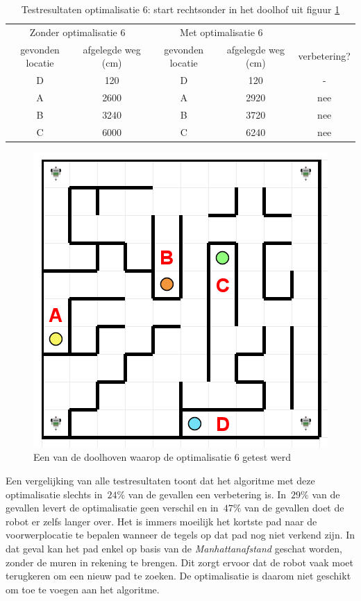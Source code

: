 \documentclass[eind]{penoverslag}
\begin{document}
\begin{table}[h]
\begin{center}
    \begin{tabular}{c | c | c | c | c}
   \multicolumn{2}{c|}{Zonder optimalisatie 6} & \multicolumn{2}{|c|}{Met optimalisatie 6} &\\
     gevonden locatie &  afgelegde weg (cm) & gevonden locatie &  afgelegde weg (cm)& verbetering?\\ \hline\hline
    D & 120 & D & 120 & -\\ \hline
    A & 2600 & A & 2920 & nee\\ \hline
    B & 3240 & B & 3720 & nee\\ \hline
    C & 6000 & C & 6240 & nee\\
    \end{tabular}
    \caption{Testresultaten optimalisatie 6: start rechtsonder in het doolhof uit figuur \ref{fig:TestDead}}
    \label{tab:resultVerken2}
\end{center}
\end{table}

\begin{figure}[!h]
\centering
	\includegraphics[scale=0.5]{doolhof3}
	\caption{Een van de doolhoven waarop de optimalisatie 6 getest werd}
\label{fig:TestDead}
\end{figure}

Een vergelijking van alle testresultaten toont dat het algoritme met deze optimalisatie slechts in~$24\%$ van de gevallen een verbetering is. In~$29\%$ van de gevallen levert de optimalisatie geen verschil en in~$47\%$ van de gevallen doet de robot er zelfs langer over. Het is immers moeilijk het kortste pad naar de voorwerplocatie te bepalen wanneer de tegels op dat pad nog niet verkend zijn. In dat geval kan het pad enkel op basis van de \textit{Manhattanafstand} geschat worden, zonder de muren in rekening te brengen. Dit zorgt ervoor dat de robot vaak moet terugkeren om een nieuw pad te zoeken. De optimalisatie is daarom niet geschikt om toe te voegen aan het algoritme.
\end{document}
